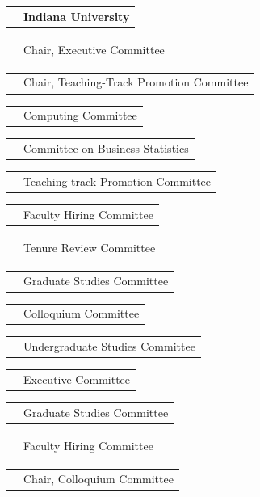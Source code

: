 \documentclass[11pt,letterpaper]{minimal/moderncv}
\makeatletter
\newcommand{\xx}{\textcolor{white}{2022}}
\newcommand{\xxx}{\textcolor{white}{--2022}}
\renewcommand{\cventry}[2]{\cvitem{#1}{\begin{minipage}[t]{\maincolumnwidth}#2\end{minipage}}}
\renewcommand{\section}[1]{  \par\addvspace{15pt}%
  \parbox[t]{\hintscolumnwidth}{\strut\raggedleft\raisebox{4pt}%
  {\rule{\hintscolumnwidth}{2pt}}}%
  \hspace{\separatorcolumnwidth}%
  \textsc{\Large #1}\par\nobreak\addvspace{6pt}%
}
\renewcommand*{\cvitem}[2]{%
  \begin{tabular}{@{}p{\hintscolumnwidth}@{\hspace{\separatorcolumnwidth}}%
    p{\maincolumnwidth}@{}}%
    \raggedleft {#1} &  {#2}%
  \end{tabular}%
}
\makeatother
\begin{document}
\vspace{6pt}
\cvitem{}{\textbf{Indiana University}}
\cvitem{2019--2020}{Chair, Executive Committee}

\cvitem{2019--2020}{Chair, Teaching-Track Promotion Committee}

\cvitem{2019--2020}{Computing Committee}

\cvitem{2019--2020}{Committee on Business Statistics}

\cvitem{2018--2020}{Teaching-track Promotion Committee}

\cvitem{2018--2020}{Faculty Hiring Committee}

\cvitem{2018--2020}{Tenure Review Committee}

\cvitem{2016--2020}{Graduate Studies Committee}

\cvitem{2012--2018}{Colloquium Committee}

\cvitem{2015--2016}{Undergraduate Studies Committee}

\cvitem{2015--2016}{Executive Committee}

\cvitem{2012--2015}{Graduate Studies Committee}

\cvitem{2012--2015}{Faculty Hiring Committee}

\cvitem{2013--2014}{Chair, Colloquium Committee}






    
\end{document}
